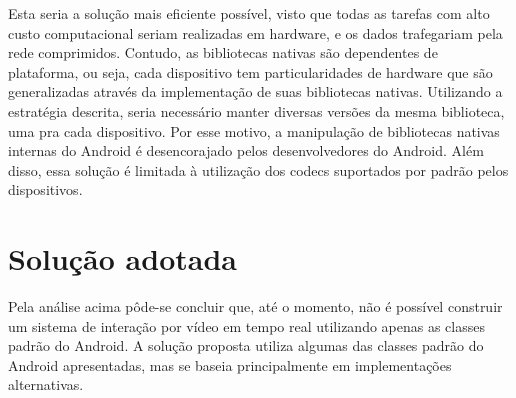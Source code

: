 \documentclass{acm_proc_article-sp}
\begin{document}
Esta seria a solução mais eficiente possível, visto que todas as tarefas com alto custo computacional seriam realizadas em hardware, e os dados trafegariam pela rede comprimidos. Contudo, as bibliotecas nativas são dependentes de plataforma, ou seja, cada dispositivo tem particularidades de hardware que são generalizadas através da implementação de suas bibliotecas nativas. Utilizando a estratégia descrita, seria necessário manter diversas versões da mesma biblioteca, uma pra cada dispositivo. Por esse motivo, a manipulação de bibliotecas nativas internas do Android é desencorajado pelos desenvolvedores do Android. Além disso, essa solução é limitada à utilização dos codecs suportados por padrão pelos dispositivos.

\section{Solução adotada}

Pela análise acima pôde-se concluir que, até o momento, não é possível construir um sistema de interação por vídeo em tempo real utilizando apenas as classes padrão do Android. A solução proposta utiliza algumas das classes padrão do Android apresentadas, mas se baseia principalmente em implementações alternativas.
\end{document}

